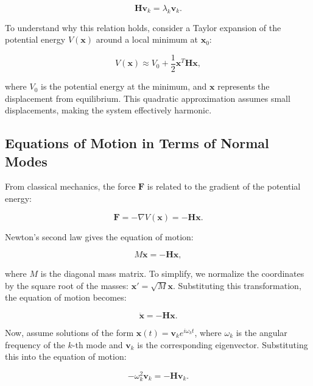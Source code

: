 \documentclass[English, Lau, oneside]{sapthesis}
\begin{document}
\begin{equation}
\mathbf{H} \mathbf{v}_k = \lambda_k \mathbf{v}_k.
\end{equation}

To understand why this relation holds, consider a Taylor expansion of the potential energy \( V(\mathbf{x}) \) around a local minimum at \( \mathbf{x}_0 \):

\begin{equation}
V(\mathbf{x}) \approx V_0 + \frac{1}{2} \mathbf{x}^T \mathbf{H} \mathbf{x},
\end{equation}

where \( V_0 \) is the potential energy at the minimum, and \( \mathbf{x} \) represents the displacement from equilibrium. This quadratic approximation assumes small displacements, making the system effectively harmonic.

\subsection{Equations of Motion in Terms of Normal Modes}

From classical mechanics, the force \( \mathbf{F} \) is related to the gradient of the potential energy:

\begin{equation}
\mathbf{F} = -\nabla V(\mathbf{x}) = -\mathbf{H} \mathbf{x}.
\end{equation}

Newton's second law gives the equation of motion:

\begin{equation}
M \ddot{\mathbf{x}} = -\mathbf{H} \mathbf{x},
\end{equation}

where \( M \) is the diagonal mass matrix. To simplify, we normalize the coordinates by the square root of the masses: \( \mathbf{x}' = \sqrt{M} \mathbf{x} \). Substituting this transformation, the equation of motion becomes:

\begin{equation}
\ddot{\mathbf{x}} = -\mathbf{H} \mathbf{x}.
\end{equation}

Now, assume solutions of the form \( \mathbf{x}(t) = \mathbf{v}_k e^{i \omega_k t} \), where \( \omega_k \) is the angular frequency of the \( k \)-th mode and \( \mathbf{v}_k \) is the corresponding eigenvector. Substituting this into the equation of motion:

\begin{equation}
-\omega_k^2 \mathbf{v}_k = -\mathbf{H} \mathbf{v}_k.
\end{equation}
\end{document}
